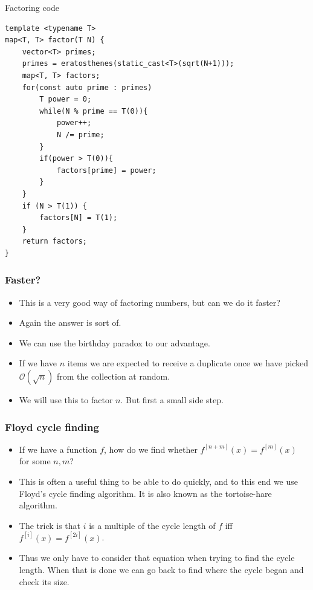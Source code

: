 \documentclass{beamer}
\begin{document}
\begin{frame}{Factoring code}
    \begin{verbatim}
template <typename T>
map<T, T> factor(T N) {
    vector<T> primes;
    primes = eratosthenes(static_cast<T>(sqrt(N+1)));
    map<T, T> factors;
    for(const auto prime : primes)
        T power = 0;
        while(N % prime == T(0)){
            power++;
            N /= prime;
        }
        if(power > T(0)){
            factors[prime] = power;
        }
    }
    if (N > T(1)) {
        factors[N] = T(1);
    }
    return factors;
}
  \end{verbatim}
\end{frame}

\begin{frame}[plain]
\frametitle{Faster?}

\begin{itemize}
    \item<1-> This is a very good way of factoring numbers, but can we do it faster?
    \item<2-> Again the answer is sort of.
    \item<3-> We can use the birthday paradox to our advantage.
    \item<4-> If we have $n$ items we are expected to receive a duplicate once we have picked $\mathcal{O}(\sqrt{n})$ from the collection at random. 
    \item<5-> We will use this to factor $n$. But first a small side step.
\end{itemize}

\end{frame}

\begin{frame}[plain]
\frametitle{Floyd cycle finding}

\begin{itemize}

\item<1-> If we have a function $f$, how do we find whether $f^{[n+m]}(x) = f^{[m]}(x)$ for some $n, m$?
\item<2-> This is often a useful thing to be able to do quickly, and to this end we use Floyd's cycle finding algorithm. It is also known as the tortoise-hare algorithm.
\item<3-> The trick is that $i$ is a multiple of the cycle length of $f$ iff  $f^{[i]}(x) = f^{[2i]}(x)$.
\item<4-> Thus we only have to consider that equation when trying to find the cycle length. When that is done we can go back to find where the cycle began and check its size.

\end{itemize}

\end{frame}
\end{document}
